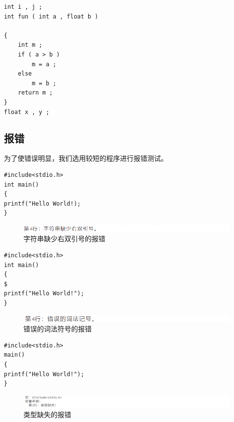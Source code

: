 \documentclass[supercite]{Experimental_Report}
\theoremstyle{definition}
\begin{document}
\begin{lstlisting}[title=样例,frame=none]
int i , j ;
int fun ( int a , float b ) 
	
{
	int m ;
	if ( a > b ) 
		m = a ;
	else 
		m = b ;
	return m ;
}
float x , y ;
\end{lstlisting}

\subsection{报错}
为了使错误明显，我们选用较短的程序进行报错测试。

\begin{lstlisting}[title=词法错误：字符串缺少右双引号,frame=none]
#include<stdio.h>
int main()
{
printf("Hello World!);
}
\end{lstlisting}

\begin{figure}[htb]
	\begin{center}
		\includegraphics[scale=1]{images/报错1.png}
		\caption{字符串缺少右双引号的报错}
		\label{fig2-1}
	\end{center}
\end{figure}

\begin{lstlisting}[title=词法错误：错误的词法符号,frame=none]
#include<stdio.h>
int main()
{
$
printf("Hello World!");
}
\end{lstlisting}

\begin{figure}[htb]
	\begin{center}
		\includegraphics[scale=1]{images/报错3.png}
		\caption{错误的词法符号的报错}
		\label{fig2-2}
	\end{center}
\end{figure}

\begin{lstlisting}[title=语法错误：类型缺失,frame=none]
#include<stdio.h>
main()
{
printf("Hello World!");
}
\end{lstlisting}

\begin{figure}[htb]
	\begin{center}
		\includegraphics[scale=0.8]{images/报错2.png}
		\caption{类型缺失的报错}
		\label{fig2-3}
	\end{center}
\end{figure}
\end{document}
